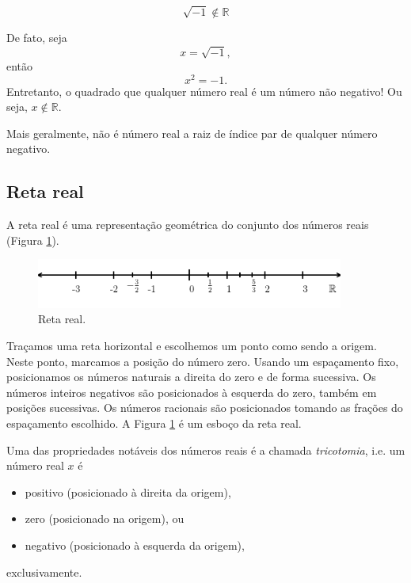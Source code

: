 \begin{obs}
  \begin{equation}
    \sqrt{-1}\not\in\mathbb{R}
  \end{equation}

  De fato, seja
  \begin{equation}
    x = \sqrt{-1},
  \end{equation}
  então
  \begin{equation}
    x^2 = -1.
  \end{equation}
  Entretanto, o quadrado que qualquer número real é um número não negativo! Ou seja, $x\not\in\mathbb{R}$.

  Mais geralmente, não é número real a raiz de índice par de qualquer número negativo.
\end{obs}

\subsection{Reta real}

A reta real é uma representação geométrica do conjunto dos números reais (Figura \ref{fig:conjreal_retareal}).

\begin{figure}[H]
  \centering
  \includegraphics[width=0.9\textwidth]{./cap_numreal/dados/fig_retareal/fig_retareal}
  \caption{Reta real.}
  \label{fig:conjreal_retareal}
\end{figure}

Traçamos uma reta horizontal e escolhemos um ponto como sendo a origem. Neste ponto, marcamos a posição do número zero. Usando um espaçamento fixo, posicionamos os números naturais a direita do zero e de forma sucessiva. Os números inteiros negativos são posicionados à esquerda do zero, também em posições sucessivas. Os números racionais são posicionados tomando as frações do espaçamento escolhido. A Figura \ref{fig:conjreal_retareal} é um esboço da reta real.

Uma das propriedades notáveis dos números reais é a chamada \emph{tricotomia}, i.e. um número real $x$ é
\begin{itemize}
\item positivo (posicionado à direita da origem),
\item zero (posicionado na origem), ou
\item negativo (posicionado à esquerda da origem),
\end{itemize}
exclusivamente.

